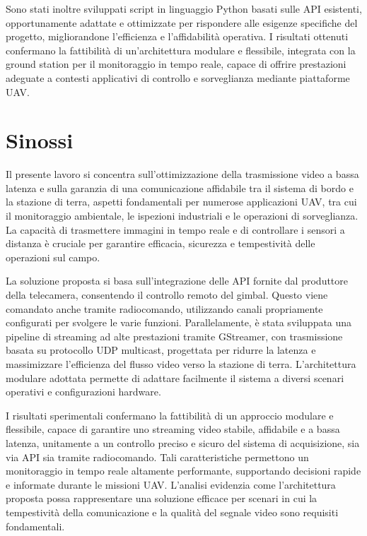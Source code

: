 Sono stati inoltre sviluppati script in linguaggio Python basati sulle API esistenti, opportunamente adattate e ottimizzate per rispondere alle esigenze specifiche del progetto, migliorandone l’efficienza e l’affidabilità operativa. I risultati ottenuti confermano la fattibilità di un’architettura modulare e flessibile, integrata con la ground station per il monitoraggio in tempo reale, capace di offrire prestazioni adeguate a contesti applicativi di controllo e sorveglianza mediante piattaforme UAV.
\section{Sinossi}
Il presente lavoro si concentra sull’ottimizzazione della trasmissione video a bassa latenza e sulla garanzia di una comunicazione affidabile tra il sistema di bordo e la stazione di terra, aspetti fondamentali per numerose applicazioni UAV, tra cui il monitoraggio ambientale, le ispezioni industriali e le operazioni di sorveglianza. La capacità di trasmettere immagini in tempo reale e di controllare i sensori a distanza è cruciale per garantire efficacia, sicurezza e tempestività delle operazioni sul campo.\bigskip

La soluzione proposta si basa sull’integrazione delle API fornite dal produttore della telecamera, consentendo il controllo remoto del gimbal. Questo viene comandato anche tramite radiocomando, utilizzando canali propriamente configurati per svolgere le varie funzioni. Parallelamente, è stata sviluppata una pipeline di streaming ad alte prestazioni tramite GStreamer, con trasmissione basata su protocollo UDP multicast, progettata per ridurre la latenza e massimizzare l’efficienza del flusso video verso la stazione di terra. L’architettura modulare adottata permette di adattare facilmente il sistema a diversi scenari operativi e configurazioni hardware.\bigskip

I risultati sperimentali confermano la fattibilità di un approccio modulare e flessibile, capace di garantire uno streaming video stabile, affidabile e a bassa latenza, unitamente a un controllo preciso e sicuro del sistema di acquisizione, sia via API sia tramite radiocomando. Tali caratteristiche permettono un monitoraggio in tempo reale altamente performante, supportando decisioni rapide e informate durante le missioni UAV. L’analisi evidenzia come l’architettura proposta possa rappresentare una soluzione efficace per scenari in cui la tempestività della comunicazione e la qualità del segnale video sono requisiti fondamentali.


